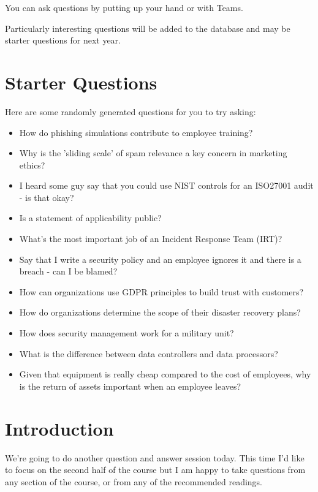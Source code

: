 \documentclass[12pt]{article}
\begin{document}
You can ask questions by putting up your hand or with Teams.  

Particularly interesting questions will be added to the database and may be starter questions for next year.  

\section*{Starter Questions} 
Here are some randomly generated questions for you to try asking: 

\begin{itemize}
  \item How do phishing simulations contribute to employee training?
  \item Why is the 'sliding scale' of spam relevance a key concern in marketing ethics?
  \item I heard some guy say that you could use NIST controls for an ISO27001 audit - is that okay?
  \item Is a statement of applicability public?
  \item What's the most important job of an Incident Response Team (IRT)?
  \item Say that I write a security policy and an employee ignores it and there is a breach - can I be blamed?
  \item How can organizations use GDPR principles to build trust with customers?
  \item How do organizations determine the scope of their disaster recovery plans?
  \item How does security management work for a military unit?
  \item What is the difference between data controllers and data processors?
  \item Given that equipment is really cheap compared to the cost of employees, why is the return of assets important when an employee leaves?
\end{itemize}


%
%



\maketitle

\section*{Introduction}
We're going to do another question and answer session today. This time I'd like to focus on the second half of the course but I am happy to take questions from any section of the course, or from any of the recommended readings. 
\end{document}
